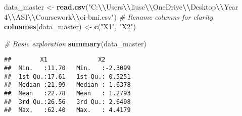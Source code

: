 \documentclass[
]{article}
\newenvironment{Shaded}{\begin{snugshade}}{\end{snugshade}}
\newcommand{\AttributeTok}[1]{\textcolor[rgb]{0.13,0.29,0.53}{#1}}
\newcommand{\CommentTok}[1]{\textcolor[rgb]{0.56,0.35,0.01}{\textit{#1}}}
\newcommand{\DecValTok}[1]{\textcolor[rgb]{0.00,0.00,0.81}{#1}}
\newcommand{\FloatTok}[1]{\textcolor[rgb]{0.00,0.00,0.81}{#1}}
\newcommand{\FunctionTok}[1]{\textcolor[rgb]{0.13,0.29,0.53}{\textbf{#1}}}
\newcommand{\NormalTok}[1]{#1}
\newcommand{\OtherTok}[1]{\textcolor[rgb]{0.56,0.35,0.01}{#1}}
\newcommand{\SpecialCharTok}[1]{\textcolor[rgb]{0.81,0.36,0.00}{\textbf{#1}}}
\newcommand{\StringTok}[1]{\textcolor[rgb]{0.31,0.60,0.02}{#1}}
\begin{document}
\begin{Shaded}
\begin{Highlighting}[]
\NormalTok{data\_master }\OtherTok{\textless{}{-}} \FunctionTok{read.csv}\NormalTok{(}\StringTok{"C:}\SpecialCharTok{\textbackslash{}\textbackslash{}}\StringTok{Users}\SpecialCharTok{\textbackslash{}\textbackslash{}}\StringTok{liusc}\SpecialCharTok{\textbackslash{}\textbackslash{}}\StringTok{OneDrive}\SpecialCharTok{\textbackslash{}\textbackslash{}}\StringTok{Desktop}\SpecialCharTok{\textbackslash{}\textbackslash{}}\StringTok{Year 4}\SpecialCharTok{\textbackslash{}\textbackslash{}}\StringTok{ASI}\SpecialCharTok{\textbackslash{}\textbackslash{}}\StringTok{Coursework}\SpecialCharTok{\textbackslash{}\textbackslash{}}\StringTok{oi{-}bmi.csv"}\NormalTok{)}
\CommentTok{\# Rename columns for clarity}
\FunctionTok{colnames}\NormalTok{(data\_master) }\OtherTok{\textless{}{-}} \FunctionTok{c}\NormalTok{(}\StringTok{"X1"}\NormalTok{, }\StringTok{"X2"}\NormalTok{)}


\CommentTok{\# Basic exploration}
\FunctionTok{summary}\NormalTok{(data\_master)}
\end{Highlighting}
\end{Shaded}

\begin{verbatim}
##        X1              X2         
##  Min.   :11.70   Min.   :-2.3099  
##  1st Qu.:17.61   1st Qu.: 0.5251  
##  Median :21.99   Median : 1.6378  
##  Mean   :22.78   Mean   : 1.2793  
##  3rd Qu.:26.56   3rd Qu.: 2.6498  
##  Max.   :62.40   Max.   : 4.4179
\end{verbatim}

\begin{Shaded}
\end{Shaded}
\end{document}
